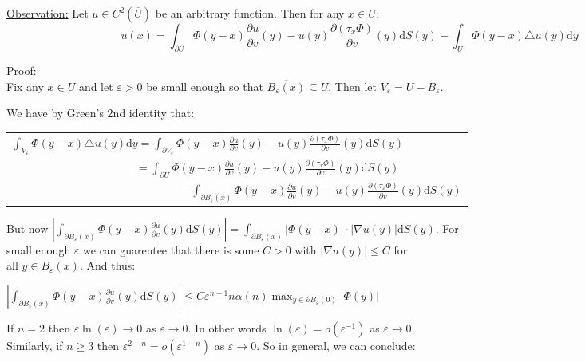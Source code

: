 \documentclass{book}
\newcommand{\pracTwo}{
   \color{Orange}%
   \fontsize{12}{14}\selectfont%
}
\newcommand{\exTwo}{%
   \color{Purple}%
   \fontsize{13}{15}\selectfont%
}
\newenvironment{myIndent}{%
   \begin{adjustwidth}{2.5em}{0em}%
}{%
   \end{adjustwidth}%
}
\newcommand{\df}{\mathrm{d}}
\newcommand{\retTwo}{\hfill\bigbreak}
\begin{document}
\exTwo\ul{Observation:} Let $u \in C^2(\overline{U})$ be an arbitrary function. Then for any $x \in U$:
$$u(x) = \int_{\partial U} \Phi(y - x)\frac{\partial u}{\partial v}(y) - u(y)\frac{\partial (\tau_x\Phi)}{\partial v}(y)\df S(y) - \int_U \Phi(y - x)\triangle u(y)\df y$$
\begin{myIndent}\pracTwo
	Proof:\\
	Fix any $x \in U$ and let $\varepsilon > 0$ be small enough so that $\overline{B_\varepsilon(x)} \subseteq U$. Then let $V_\varepsilon = U - B_\varepsilon$.\retTwo

	We have by {\color{OliveGreen}Green's $2$nd identity} that:

	{\centering\begin{tabular}{l}
		$\int_{V_\varepsilon} \Phi(y - x)\triangle u(y) \df y = \int_{\partial V_\varepsilon} \Phi(y - x) \frac{\partial u}{\partial v}(y) - u(y)\frac{\partial (\tau_x\Phi)}{\partial v}(y)\df S(y)$\\ [8pt]
		$\phantom{\int_U \Phi(y - x)\triangle u(y) \df y} = \int_{\partial U} \Phi(y - x) \frac{\partial u}{\partial v}(y) - u(y)\frac{\partial (\tau_x\Phi)}{\partial v}(y)\df S(y)$\\ [2pt]
		$\phantom{aaaaaaaaaaaaaaaaaaaaaaaaaaaa} - \int_{\partial B_\varepsilon(x)} \Phi(y-x) \frac{\partial u}{\partial v}(y) - u(y)\frac{\partial (\tau_x\Phi)}{\partial v}(y)\df S(y)$
	\end{tabular}\retTwo\par}

	But now $\left|\int_{\partial B_\varepsilon(x)} \Phi(y - x) \frac{\partial u}{\partial v}(y)\df S(y)\right| = \int_{\partial B_\varepsilon(x)} |\Phi(y - x)| \cdot |\nabla u(y)|\df S(y)$. For\\ small enough $\varepsilon$ we can guarentee that there is some $C > 0$ with $|\nabla u(y)| \leq C$ for\\ all $y \in B_\varepsilon(x)$. And thus:

	{\centering $\left|\int_{\partial B_\varepsilon(x)} \Phi(y - x) \frac{\partial u}{\partial v}(y)\df S(y)\right| \leq C\varepsilon^{n-1} n\alpha(n) \max_{y \in \partial B_\varepsilon(0)}|\Phi(y)|$ \retTwo\par}

	If $n = 2$ then $\varepsilon \ln(\varepsilon) \to 0$ as $\varepsilon \to 0$. In other words $\ln(\varepsilon) = o(\varepsilon^{-1})$ as $\varepsilon \to 0$.\\ Similarly, if $n \geq 3$ then $\varepsilon^{2-n} = o(\varepsilon^{1 - n})$ as $\varepsilon \to 0$. So in general, we can conclude:


\end{myIndent}
\end{document}
